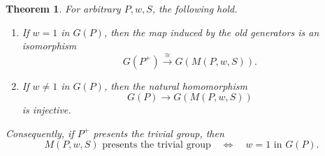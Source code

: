 \documentclass[a4paper,11pt,reqno]{amsart}
\newtheorem{theorem}{Theorem}
\theoremstyle{definition}
\theoremstyle{remark}
\begin{document}
	\begin{theorem}
		\label{thm:miller-tancer}
		For arbitrary $P,w,S$, the following hold.
		\begin{enumerate}[label=\textup{(\roman*)}]
			\item If $w=1$ in $G(P)$, then the map induced by the old generators is
			an isomorphism
			\[
			G(P^+)\xrightarrow{\ \cong\ }G(M(P,w,S)).
			\]
			\item If $w\ne1$ in $G(P)$, then the natural homomorphism
			\[
			G(P)\longrightarrow G(M(P,w,S))
			\]
			is injective.
		\end{enumerate}
		Consequently, if $P^+$ presents the trivial group, then
		\[
		M(P,w,S)\text{ presents the trivial group}
		\quad\Longleftrightarrow\quad
		w=1\text{ in }G(P).
		\]
	\end{theorem}
	
\end{document}
